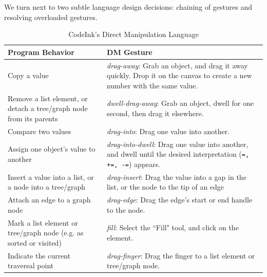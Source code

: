 We turn next to two subtle language design decisions: chaining of gestures and
resolving overloaded gestures.

\begin{table}[!t]
\vspace{-2em}
\renewcommand{\arraystretch}{1.75}
\caption{CodeInk's Direct Manipulation Language}
\label{tbl:language_table}
\centering
\begin{tabular}{|p{3.8cm} |p{3.8cm} |}
\hline
\textbf{Program Behavior} & \textbf{DM Gesture} \\
\hline
Copy a value & {\em drag-away}: Grab an object, and drag it away quickly.
Drop it on the canvas to create a new number with the same value.
\\
\hline
Remove a list element, or detach a tree/graph node from its parents &
{\em dwell-drag-away}: Grab an object, dwell for one second, then
drag it elsewhere.
\\
\hline
Compare two values & {\em drag-into}: Drag one value into another.
\\
\hline
Assign one object's value to another &
{\em drag-into-dwell}: Drag one value into another, and
dwell until the desired interpretation (\texttt{=, +=, -=}) appears. \\
\hline
Insert a value into a list, or a node into a tree/graph
& {\em drag-insert}: Drag the value into a gap in the list, or the node to the
tip of an edge
\\

\hline
Attach an edge to a graph node
& {\em drag-edge}: Drag the edge's start or end handle to the node.
\\

\hline
Mark a list element or tree/graph node (e.g. as sorted or visited) &
{\em fill}: Select the ``Fill" tool, and click on the element. \\
\hline
Indicate the current traversal point & {\em drag-finger}: Drag the finger to a
list element or tree/graph node.
\\
\hline
\end{tabular}
\end{table}

